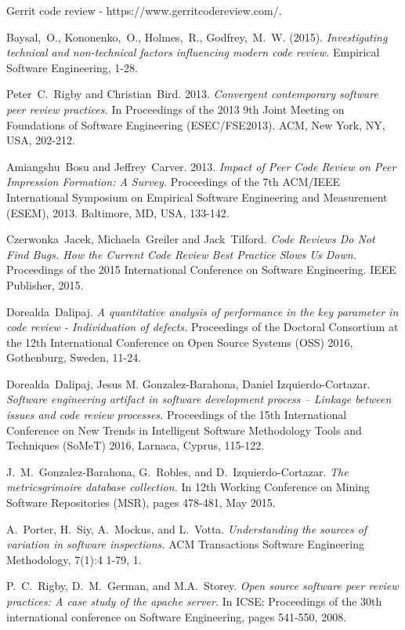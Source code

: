 \documentclass[10pt, conference]{IEEEtran}
\begin{document}
\begin{thebibliography}{1}
Gerrit code review - https://www.gerritcodereview.com/.

Baysal,~O., Kononenko,~O., Holmes,~R., Godfrey,~M.~W. 
(2015). \emph{Investigating technical and non-technical 
factors influencing modern code review.} Empirical
Software Engineering, 1-28.

Peter~C.~Rigby and Christian~Bird. 2013. \emph{Convergent
contemporary software peer review practices.} In
Proceedings of the 2013 9th Joint Meeting on
Foundations of Software Engineering
(ESEC/FSE2013). ACM, New York, NY, USA, 202-212.

Amiangshu~Bosu and Jeffrey~Carver. 2013. \emph{Impact of
Peer Code Review on Peer Impression Formation: A
Survey.} Proceedings of the 7th ACM/IEEE
International Symposium on Empirical Software
Engineering and Measurement (ESEM), 2013.
Baltimore, MD, USA, 133-142.

Czerwonka~Jacek, Michaela~Greiler and Jack~Tilford.
\emph{Code Reviews Do Not Find Bugs. How the Current
Code Review Best Practice Slows Us Down.}
Proceedings of the 2015 International Conference on
Software Engineering. IEEE Publisher, 2015.

Dorealda~Dalipaj. \emph{A quantitative analysis of
performance in the key parameter in code review -
Individuation of defects.} Proceedings of the Doctoral Consortium at the 12th 
International Conference on Open Source Systems (OSS) 2016, Gothenburg, Sweden, 
11-24.

Dorealda~Dalipaj, Jesus M. Gonzalez-Barahona, Daniel Izquierdo-Cortazar.
\emph{Software engineering artifact in software development process – 
Linkage between issues and code review processes.}
Proceedings of the 15th International Conference on New Trends 
in Intelligent Software Methodology Tools and Techniques (SoMeT) 2016, 
Larnaca, Cyprus, 115-122.

J.~M.~Gonzalez-Barahona, G.~Robles, and D.~Izquierdo-Cortazar. 
\emph{The metricsgrimoire database
collection.} In 12th Working Conference on Mining
Software Repositories (MSR), pages 478-481, May
2015.

A.~Porter, H.~Siy, A.~Mockus, and L.~Votta.
\emph{Understanding the sources of variation in software
inspections.} ACM Transactions Software Engineering
Methodology, 7(1):4 1-79, 1.

P.~C.~Rigby, D.~M.~German, and M.A.~Storey. \emph{Open
source software peer review practices: A case study of
the apache server.} In ICSE: Proceedings of the 30th
international conference on Software Engineering,
pages 541-550, 2008.


\end{thebibliography}
\end{document}

